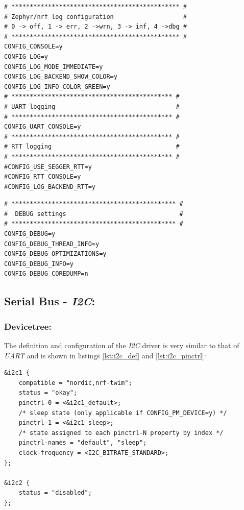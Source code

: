 \documentclass[report.tex]{subfiles}
\begin{document}
\begin{lstlisting}[style=console,label={lst:log_conf},caption={Application \textit{Logging} Configuration}]
# ********************************************** #
# Zephyr/nrf log configuration                   #
# 0 -> off, 1 -> err, 2 ->wrn, 3 -> inf, 4 ->dbg #
# ********************************************** #
CONFIG_CONSOLE=y
CONFIG_LOG=y
CONFIG_LOG_MODE_IMMEDIATE=y
CONFIG_LOG_BACKEND_SHOW_COLOR=y
CONFIG_LOG_INFO_COLOR_GREEN=y
# ******************************************** #
# UART logging                                 #
# ******************************************** #
CONFIG_UART_CONSOLE=y
# ******************************************** #
# RTT logging                                  #
# ******************************************** #
#CONFIG_USE_SEGGER_RTT=y
#CONFIG_RTT_CONSOLE=y
#CONFIG_LOG_BACKEND_RTT=y
\end{lstlisting}

\begin{lstlisting}[style=console,label={lst:debug_conf},caption={Application \textit{Debug} Configuration}]
# ********************************************* #
#  DEBUG settings                               #
# ********************************************* #
CONFIG_DEBUG=y
CONFIG_DEBUG_THREAD_INFO=y
CONFIG_DEBUG_OPTIMIZATIONS=y
CONFIG_DEBUG_INFO=y
CONFIG_DEBUG_COREDUMP=n
\end{lstlisting}

\subsection{Serial Bus - \textit{I2C}:}
\subsubsection{Devicetree:}
The definition and configuration of the \textit{I2C} driver is very similar to that of \textit{UART} and is shown in listings \ref{lst:i2c_def} and \ref{lst:i2c_pinctrl}:
\begin{lstlisting}[style=C,label={lst:i2c_def},caption={\textit{DT I2C} Description}]
&i2c1 {
    compatible = "nordic,nrf-twim";
	status = "okay";
    pinctrl-0 = <&i2c1_default>;
    /* sleep state (only applicable if CONFIG_PM_DEVICE=y) */
    pinctrl-1 = <&i2c1_sleep>;
    /* state assigned to each pinctrl-N property by index */
    pinctrl-names = "default", "sleep";
    clock-frequency = <I2C_BITRATE_STANDARD>;
};

&i2c2 {
    status = "disabled";
};
\end{lstlisting}
\end{document}
